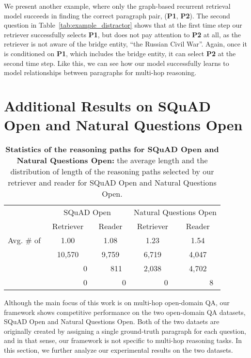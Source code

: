 \documentclass{article} \usepackage{iclr2020_conference,times}
\begin{document}
We present another example, where only the graph-based recurrent retrieval model succeeds in finding the correct paragraph pair, ({\bf P1}, {\bf P2}).
The second question in Table~\ref{tab:example_distractor} shows that at the first time step our retriever successfully selects {\bf P1}, but does not pay attention to {\bf P2} at all, as the retriever is not aware of the bridge entity, ``the Russian Civil War''.
Again, once it is conditioned on {\bf P1}, which includes the bridge entity, it can select {\bf P2} at the second time step. 
Like this, we can see how our model successfully learns to model relationships between paragraphs for multi-hop reasoning.


\section{Additional Results on SQuAD Open and Natural Questions Open}
\label{sec:squad_nq_additional_result}


\begin{table}[t]

\begin{center}
\begin{tabular}{c| c |c || c | c}\toprule
 & \multicolumn{2}{c}{SQuAD Open} & \multicolumn{2}{c}{Natural Questions Open} \\
 & Retriever & Reader & Retriever & Reader \\
Avg. \# of  & 1.00 & 1.08  & 1.23 & 1.54 \\
\midrule
 &     10,570 &    9,759 &    6,719 &    4,047 \\
 & ~~~~~~~~~0 &   ~~~811 &    2,038 &    4,702 \\
 & ~~~~~~~~~0 & ~~~~~~~0 & ~~~~~~~0 & ~~~~~~~8 \\
\bottomrule
\end{tabular}
\caption{{\bf Statistics of the reasoning paths for SQuAD Open and Natural Questions Open:} the average length and the distribution of length of the reasoning paths selected by our retriever and reader for SQuAD Open and Natural Questions Open.
}\label{tab:comparison_num_retrieval_squad_nq}
\end{center}

\end{table}

Although the main focus of this work is on multi-hop open-domain QA, our framework shows competitive performance on the two open-domain QA datasets, SQuAD Open and Natural Questions Open.
Both of the two dataets are originally created by assigning a single ground-truth paragraph for each question, and in that sense, our framework is not specific to multi-hop reasoning tasks.
In this section, we further analyze our experimental results on the two datasets.
\end{document}

